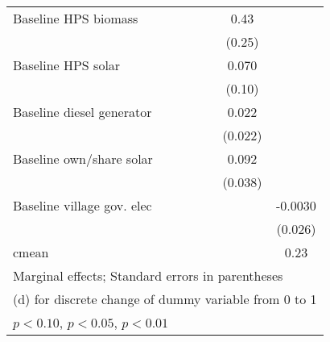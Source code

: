 \begin{table}[htbp]
\begin{tabular*}{1\hsize}{@{\hskip\tabcolsep\extracolsep\fill}l*{6}{c}}
Baseline HPS biomass&                  &                  &                  &                  &     0.43\sym{*}  &                  \\
                &                  &                  &                  &                  &   (0.25)         &                  \\
Baseline HPS solar&                  &                  &                  &                  &    0.070         &                  \\
                &                  &                  &                  &                  &   (0.10)         &                  \\
Baseline diesel generator&                  &                  &                  &                  &    0.022         &                  \\
                &                  &                  &                  &                  &  (0.022)         &                  \\
Baseline own/share solar&                  &                  &                  &                  &    0.092\sym{**} &                  \\
                &                  &                  &                  &                  &  (0.038)         &                  \\
Baseline village gov. elec&                  &                  &                  &                  &                  &  -0.0030         \\
                &                  &                  &                  &                  &                  &  (0.026)         \\
\midrule
cmean           &                  &                  &                  &                  &                  &     0.23         \\
\bottomrule
\multicolumn{7}{l}{\footnotesize Marginal effects; Standard errors in parentheses}\\
\multicolumn{7}{l}{\footnotesize  (d) for discrete change of dummy variable from 0 to 1}\\
\multicolumn{7}{l}{\footnotesize \sym{*} \(p<0.10\), \sym{**} \(p<0.05\), \sym{***} \(p<0.01\)}\\
\end{tabular*}
\end{table}
